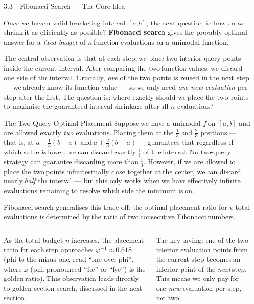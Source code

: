 \documentclass[aspectratio=169,10pt]{beamer}
\begin{document}
\begin{frame}[allowframebreaks]{3.3\ \ Fibonacci Search --- The Core Idea}

  Once we have a valid bracketing interval $[a, b]$, the next question is:
  how do we shrink it as efficiently as possible?  \textbf{Fibonacci search}
  gives the provably optimal answer for a \emph{fixed budget} of $n$ function
  evaluations on a unimodal function.

  The central observation is that at each step, we place two interior query
  points inside the current interval.  After comparing the two function values,
  we discard one side of the interval.  Crucially, \emph{one} of the two points
  is reused in the next step --- we already know its function value --- so we
  only need \emph{one new evaluation} per step after the first.  The question
  is: where exactly should we place the two points to maximise the guaranteed
  interval shrinkage after all $n$ evaluations?

  \begin{block}{The Two-Query Optimal Placement}
    Suppose we have a unimodal $f$ on $[a, b]$ and are allowed exactly
    \emph{two} evaluations.  Placing them at the $\tfrac{1}{3}$ and
    $\tfrac{2}{3}$ positions --- that is, at $a + \tfrac{1}{3}(b-a)$ and
    $a + \tfrac{2}{3}(b-a)$ --- guarantees that regardless of which value
    is lower, we can discard exactly $\tfrac{1}{3}$ of the interval.
    No two-query strategy can guarantee discarding more than $\tfrac{1}{3}$.
    However, if we are allowed to place the two points infinitesimally close
    together at the center, we can discard nearly \emph{half} the interval
    --- but this only works when we have effectively infinite evaluations
    remaining to resolve which side the minimum is on.
  \end{block}

  Fibonacci search generalises this trade-off: the optimal placement ratio
  for $n$ total evaluations is determined by the ratio of two consecutive
  Fibonacci numbers.

  \begin{columns}
    As the total budget $n$ increases, the placement ratio for each step
    approaches $\varphi^{-1} \approx 0.618$ (phi to the minus one, read
    ``one over phi'', where $\varphi$ (phi, pronounced ``fee'' or ``fye'')
    is the golden ratio).  This observation leads directly to golden section
    search, discussed in the next section.

    \medskip
    The key saving: one of the two interior evaluation points from the current
    step becomes an interior point of the \emph{next} step.  This means we
    only pay for one \emph{new} evaluation per step, not two.


\end{columns}
\end{frame}
\end{document}
